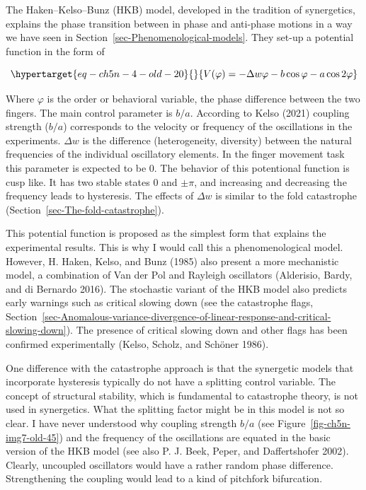 \documentclass[
  a4paper,
  DIV=11,
  numbers=noendperiod,
  oneside]{scrreprt}
\begin{document}
The Haken--Kelso--Bunz (HKB) model, developed in the tradition of
synergetics, explains the phase transition between in phase and
anti-phase motions in a way we have seen in
Section~\ref{sec-Phenomenological-models}. They set-up a potential
function in the form of

\begin{equation}\protect\hypertarget{eq-ch5n-4-old-20}{}{
V(\varphi) = - \Delta w\varphi - b\cos\varphi - a\cos{2\varphi}}\label{eq-ch5n-4-old-20}\end{equation}

Where \(\varphi\) is the order or behavioral variable, the phase
difference between the two fingers. The main control parameter is
\(b/a\). According to Kelso (2021) coupling strength (\(b/a\))
corresponds to the velocity or frequency of the oscillations in the
experiments. \(\Delta w\) is the difference (heterogeneity, diversity)
between the natural frequencies of the individual oscillatory elements.
In the finger movement task this parameter is expected to be 0. The
behavior of this potentional function is cusp like. It has two stable
states 0 and \(\pm \pi\), and increasing and decreasing the frequency
leads to hysteresis. The effects of \(\Delta w\) is similar to the fold
catastrophe (Section~\ref{sec-The-fold-catastrophe}).

This potential function is proposed as the simplest form that explains
the experimental results. This is why I would call this a
phenomenological model. However, H. Haken, Kelso, and Bunz (1985) also
present a more mechanistic model, a combination of Van der Pol and
Rayleigh oscillators (Alderisio, Bardy, and di Bernardo 2016). The
stochastic variant of the HKB model also predicts early warnings such as
critical slowing down (see the catastrophe flags,
Section~\ref{sec-Anomalous-variance-divergence-of-linear-response-and-critical-slowing-down}).
The presence of critical slowing down and other flags has been confirmed
experimentally (Kelso, Scholz, and Schöner 1986).

One difference with the catastrophe approach is that the synergetic
models that incorporate hysteresis typically do not have a splitting
control variable. The concept of structural stability, which is
fundamental to catastrophe theory, is not used in synergetics. What the
splitting factor might be in this model is not so clear. I have never
understood why coupling strength \(b/a\) (see
Figure~\ref{fig-ch5n-img7-old-45}) and the frequency of the oscillations
are equated in the basic version of the HKB model (see also P. J. Beek,
Peper, and Daffertshofer 2002). Clearly, uncoupled oscillators would
have a rather random phase difference. Strengthening the coupling would
lead to a kind of pitchfork bifurcation.
\end{document}
